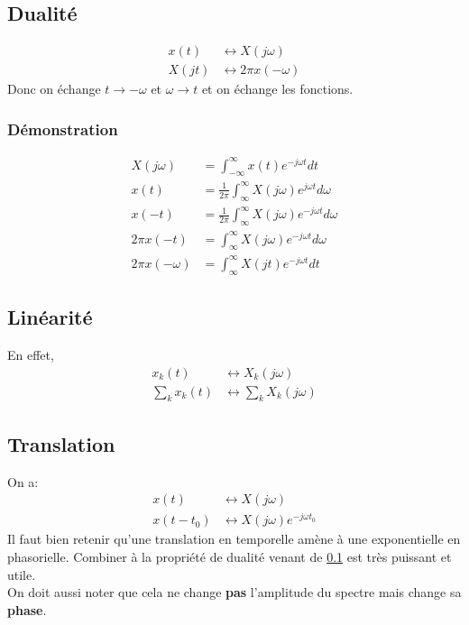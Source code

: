 \documentclass{report}
\begin{document}
\subsection{Dualité} \label{Dua}
\begin{align}
x(t) & \longleftrightarrow X(j\omega)\\
X(jt) & \longleftrightarrow 2\pi x(-\omega)
\end{align}
Donc on échange $t \rightarrow -\omega$ et $\omega \rightarrow t$ et on échange les fonctions.
\subsubsection{Démonstration}
\begin{align*}
X(j \omega) &= \int_{-\infty}^{\infty} x(t) e^{-j\omega t} dt\\
x(t) &= \frac{1}{2\pi} \int_{\infty}^{\infty} X(j\omega) e^{j\omega t} d\omega\\
x(-t) &= \frac{1}{2\pi} \int_{\infty}^{\infty} X(j\omega) e^{-j\omega t} d\omega\\
2 \pi x(-t) &= \int_{\infty}^{\infty} X(j\omega) e^{-j\omega t} d\omega\\
2 \pi x(-\omega) &= \int_{\infty}^{\infty} X(jt) e^{-j\omega t} dt
\end{align*}

\subsection{Linéarité}
En effet,
\begin{align*}
x_k(t) & \longleftrightarrow X_k(j\omega)\\
\sum_k x_k(t) & \longleftrightarrow \sum_k X_k(j\omega)
\end{align*}

\subsection{Translation}
On a:
\begin{align*}
x(t) & \longleftrightarrow X(j\omega)\\
x(t-t_0) & \longleftrightarrow X(j\omega)e^{-j \omega t_0}
\end{align*}
Il faut bien retenir qu'une translation en temporelle amène à une exponentielle en phasorielle. Combiner à la propriété de dualité venant de \ref{Dua} est très puissant et utile.\\
On doit aussi noter que cela ne change \textbf{pas} l'amplitude du spectre mais change sa \textbf{phase}.
\end{document}

